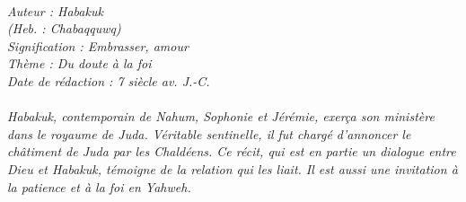 \BFont
\noindent\hrulefill
{\footnotesize
\textit{
\bigskip
{\centering{}
\\Auteur : Habakuk
\\(Heb. : Chabaqquwq)
\\Signification : Embrasser, amour
\\Thème : Du doute à la foi
\\Date de rédaction : 7 siècle av. J.-C.\\}
}
\textit{
\\Habakuk, contemporain de Nahum, Sophonie et Jérémie, exerça son ministère dans le royaume de Juda. Véritable sentinelle, il fut chargé d'annoncer le châtiment de Juda par les Chaldéens. Ce récit, qui est en partie un dialogue entre Dieu et Habakuk, témoigne de la relation qui les liait. Il est aussi une invitation à la patience et à la foi en Yahweh.\bigskip
}
}
\par\nobreak\noindent\hrulefill
